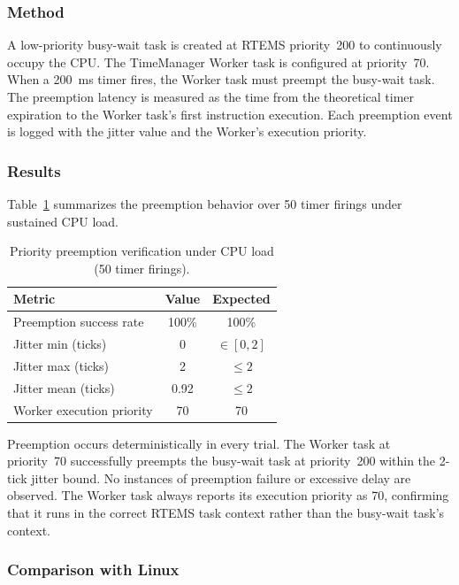 \subsubsection{Method}

A low-priority busy-wait task is created at RTEMS priority~200 to continuously occupy the CPU.
The TimeManager Worker task is configured at priority~70.
When a 200~ms timer fires, the Worker task must preempt the busy-wait task.
The preemption latency is measured as the time from the theoretical timer expiration to the Worker task's first instruction execution.
Each preemption event is logged with the jitter value and the Worker's execution priority.

\subsubsection{Results}

Table~\ref{tab:preemption} summarizes the preemption behavior over 50 timer firings under sustained CPU load.

\begin{table}[t]
\centering
\caption{Priority preemption verification under CPU load (50 timer firings).}
\label{tab:preemption}
\begin{tabular}{lcc}
\hline
\textbf{Metric} & \textbf{Value} & \textbf{Expected} \\
\hline
Preemption success rate   & 100\% & 100\% \\
Jitter min (ticks)       & 0     & $\in [0,2]$ \\
Jitter max (ticks)       & 2     & $\leqslant 2$ \\
Jitter mean (ticks)      & 0.92  & $\leqslant 2$ \\
Worker execution priority & 70    & 70 \\
\hline
\end{tabular}
\end{table}

Preemption occurs deterministically in every trial.
The Worker task at priority~70 successfully preempts the busy-wait task at priority~200 within the 2-tick jitter bound.
No instances of preemption failure or excessive delay are observed.
The Worker task always reports its execution priority as 70, confirming that it runs in the correct RTEMS task context rather than the busy-wait task's context.

\subsubsection{Comparison with Linux}

